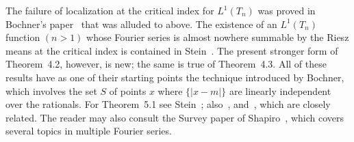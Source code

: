 \bibnoteshead

The failure of localization at the critical index for $L^1(T_n)$ was proved in Bochner's paper~\cite{Bochner7} that was alluded to above. The existence of an $L^1(T_n)$ function $(n > 1)$ whose Fourier series is almost nowhere summable by the Riesz means at the critical index is contained in Stein~\cite{Stein5}. The present stronger form of Theorem~4.2, however, is new; the same is true of Theorem~4.3. All of these results have as one of their starting points the technique introduced by Bochner, which involves the set $S$ of points $x$ where $\{|x - m|\}$ are linearly independent over the rationals. For Theorem~5.1 see Stein~\cite{Stein4}; also~\cite{Stein2}, and~\cite{Stein7}, which are closely related. The reader may also consult the Survey paper of Shapiro~\cite{Shapiro1}, which covers several topics in multiple Fourier series.
